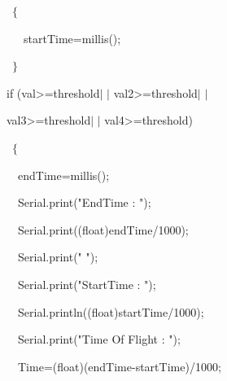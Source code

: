 \documentclass[12pt]{article}
\begin{document}
{\fontsize{14pt}{16.8pt}\selectfont \  $ \{ $ \par}\par

{\fontsize{14pt}{16.8pt}\selectfont \ \ \  startTime=millis();\par}\par

{\fontsize{14pt}{16.8pt}\selectfont \  $ \} $ \par}\par

{\fontsize{14pt}{16.8pt}\selectfont  if (val\textgreater=threshold$ \vert $ $ \vert $ val2\textgreater=threshold$ \vert $ $ \vert $ \par}\par
{\fontsize{14pt}{16.8pt}\selectfont val3\textgreater=threshold$ \vert $ $ \vert $ val4\textgreater=threshold)\par}\par

{\fontsize{14pt}{16.8pt}\selectfont \  $ \{ $ \par}\par

{\fontsize{14pt}{16.8pt}\selectfont \ \  endTime=millis();\par}\par

{\fontsize{14pt}{16.8pt}\selectfont \ \  Serial.print("EndTime : ");\par}\par

{\fontsize{14pt}{16.8pt}\selectfont \ \  Serial.print((float)endTime/1000);\par}\par

{\fontsize{14pt}{16.8pt}\selectfont \ \  Serial.print(" ");\par}\par

{\fontsize{14pt}{16.8pt}\selectfont \ \  Serial.print("StartTime : ");\par}\par

{\fontsize{14pt}{16.8pt}\selectfont \ \  Serial.println((float)startTime/1000);\par}\par

{\fontsize{14pt}{16.8pt}\selectfont \ \  Serial.print("Time Of Flight : ");\par}\par

{\fontsize{14pt}{16.8pt}\selectfont \ \  Time=(float)(endTime-startTime)/1000;\par}\par
\end{document}
